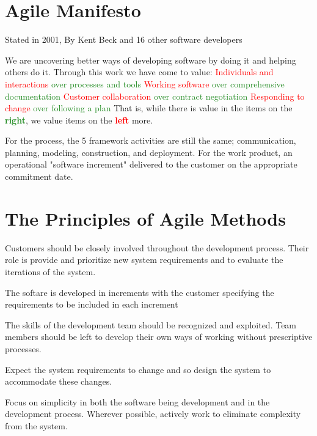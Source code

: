 \documentclass{report}
\newcommand{\textr}[1]{\textcolor{red}{#1}}
\newcommand{\textg}[1]{\textcolor{ForestGreen}{#1}}
\newcommand{\textbfr}[1]{\textbf{\textr{#1}}}
\newcommand{\textbfg}[1]{\textbf{\textg{#1}}}
\begin{document}
\section{Agile Manifesto}
\noindent Stated in 2001, By Kent Beck and 16 other software developers\newline

\noindent We are uncovering better ways of developing software by doing it and helping others do it. Through this work we have come to value:\newline
\indent\textr{Individuals and interactions} \textg{over processes and tools} \newline
\indent\textr{Working software} \textg{over comprehensive documentation} \newline
\indent\textr{Customer collaboration} \textg{over contract negotiation}\newline
\indent\textr{Responding to change} \textg{over following a plan}\newline
That is, while there is value in the items on the \textbfg{right}, we value items on the \textbfr{left} more.\newline

\noindent For the process, the 5 framework activities are still the same; communication, planning, modeling, construction, and deployment. For the work product, an operational "software increment" delivered to the customer on the appropriate commitment date.

\section{The Principles of Agile Methods}
\begin{description}[style=multiline,leftmargin=12em]
  \item [Customer involvement] Customers should be closely involved throughout the development process. Their role is provide and prioritize new system requirements and to evaluate the iterations of the system.
  \item [Incremental delivery] The softare is developed in increments with the customer specifying the requirements to be included in each increment
  \item [People not process] The skills of the development team should be recognized and exploited. Team members should be left to develop their own ways of working without prescriptive processes.
  \item [Embrace change] Expect the system requirements to change and so design the system to accommodate these changes.
  \item [Maintain simplicity] Focus on simplicity in both the software being development and in the development process. Wherever possible, actively work to eliminate complexity from the system.
\end{description}
\end{document}
